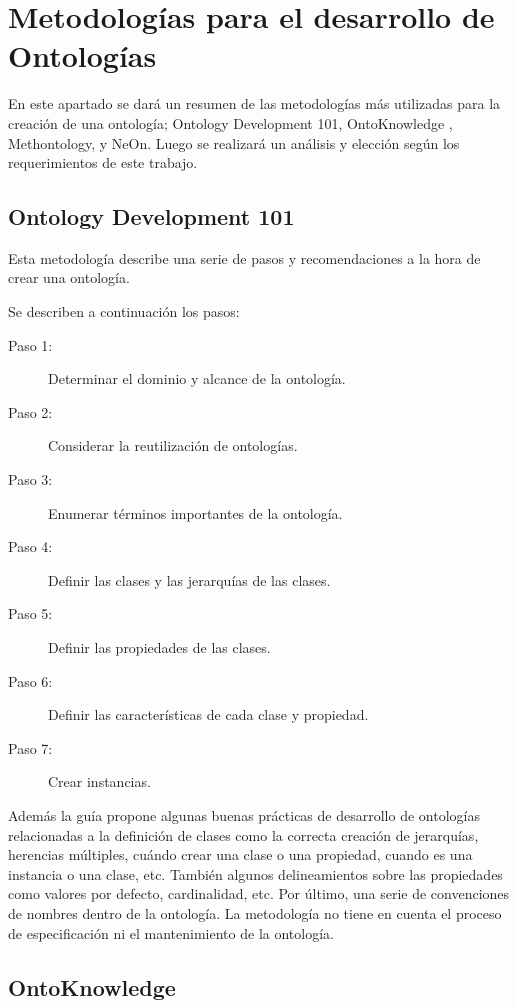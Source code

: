 \section{Metodologías para el desarrollo de Ontologías}

En este apartado se dará un resumen de las metodologías más utilizadas para la creación de una ontología; Ontology Development 101, OntoKnowledge , Methontology, y NeOn. Luego se realizará un análisis y elección según los requerimientos de este trabajo.

\subsection{Ontology Development 101}

Esta metodología describe una serie de pasos y recomendaciones a la hora de crear una ontología. 

Se describen a continuación los pasos:
\begin{description}
\item[Paso 1:] Determinar el dominio y alcance de la ontología.
\item[Paso 2:] Considerar la reutilización de ontologías.
\item[Paso 3:] Enumerar términos importantes de la ontología.
\item[Paso 4:] Definir las clases y las jerarquías de las clases.
\item[Paso 5:] Definir las propiedades de las clases.
\item[Paso 6:] Definir las características de cada clase y propiedad.
\item[Paso 7:] Crear instancias.
\end{description}

Además la guía propone algunas buenas prácticas de desarrollo de ontologías relacionadas a la definición de clases como la correcta creación de jerarquías, herencias múltiples,  cuándo crear una clase o una propiedad, cuando es una instancia o una clase, etc. También algunos delineamientos sobre las propiedades como valores por defecto, cardinalidad, etc. Por último, una serie de convenciones de nombres dentro de la ontología. La metodología no tiene en cuenta el proceso de especificación ni el mantenimiento de la ontología.

\subsection{OntoKnowledge} 

